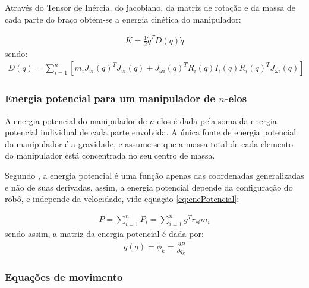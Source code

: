 Através do Tensor de Inércia, do jacobiano, da matriz de rotação e da massa de
cada parte do braço obtém-se a energia cinética do manipulador:

\begin{equation}
  \begin{gathered}
    K=\frac{1}{2}\dot q^T D(q)\dot q
  \end{gathered}
  \label{eq:ecMat}
\end{equation}
sendo:
\begin{equation}
  \begin{gathered}
    D(q)= \sum^n_{i=1}[m_iJ_{vi}(q)^TJ_{vi}(q)+J_{\omega i}(q)^TR_i(q)I_i(q)R_i(q)^TJ_{\omega i}(q)]
  \end{gathered}
  \label{eq:dq}
\end{equation}

\subsubsection{Energia potencial para um manipulador de $n$-elos}

A energia potencial do manipulador de $n$-elos é dada pela soma da energia
potencial individual de cada parte envolvida. A única fonte de energia potencial
do manipulador é a gravidade, e assume-se que a massa total de cada elemento 
do manipulador está concentrada no seu centro de massa.

Segundo , a energia potencial é uma função apenas das 
coordenadas generalizadas e não de suas derivadas, assim, a energia 
potencial depende da configuração do robô, e independe da velocidade, vide 
equação \ref{eq:enePotencial}:

\begin{equation}
  \begin{gathered}
    P = \sum^n_{i=1}P_i = \sum^n_{i=1}g^Tr_{ci}m_i
  \end{gathered}
  \label{eq:enePotencial}
\end{equation}
sendo assim, a matriz da energia potencial é dada por:
\begin{equation}
  \begin{gathered}
    g(q)=\phi_k=\frac{\partial P}{\partial q_k}
  \end{gathered}
  \label{eq:enePotencialMat}
\end{equation}

\subsubsection{Equações de movimento}

